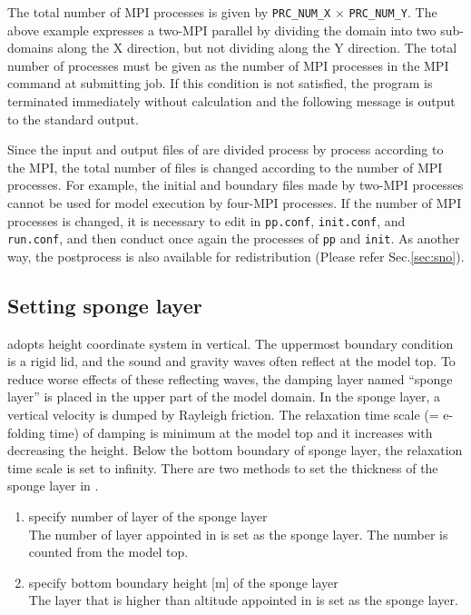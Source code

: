 The total number of MPI processes is given by \verb|PRC_NUM_X| $\times$ \verb|PRC_NUM_Y|.
The above example expresses a two-MPI parallel by dividing the domain into two sub-domains along the X direction, but not dividing along the Y direction. The total number of processes must be given as the number of MPI processes in the MPI command at submitting job.
If this condition is not satisfied,  the program is terminated immediately without calculation and the following message is output to the standard output.

Since the input and output files of \scalerm are divided process by process according to the MPI, the total number of files is changed according to the number of MPI processes.
For example, the initial and boundary files made by two-MPI processes cannot be used for model execution by four-MPI processes.
If the number of MPI processes is changed, it is necessary
to edit  in \verb|pp.conf|, \verb|init.conf|, and \verb|run.conf|,
and then conduct once again the processes of \verb|pp| and \verb|init|.
As another way, the postprocess \sno is also available for redistribution (Please refer Sec.\ref{sec:sno}).


\subsection{Setting sponge layer} \label{subsec:raydamp}

\scalerm adopts height coordinate system in vertical. The uppermost boundary condition is a rigid lid, and the sound and gravity waves often reflect at the model top. To reduce worse effects of these reflecting waves, the damping layer named ``sponge layer'' is placed in the upper part of the model domain. In the sponge layer, a vertical velocity is dumped by Rayleigh friction. The relaxation time scale (= e-folding time) of damping is minimum at the model top and it increases with decreasing the height. Below the bottom boundary of sponge layer, the relaxation time scale is set to infinity.
There are two methods to set the thickness of the sponge layer in .

\begin{enumerate}
\item specify number of layer of the sponge layer \\
  The number of layer appointed in  is set as the sponge layer. The number is counted from the model top.
\item specify bottom boundary height [m] of the sponge layer \\
  The layer that is higher than altitude appointed in  is set as the sponge layer.
\end{enumerate}

